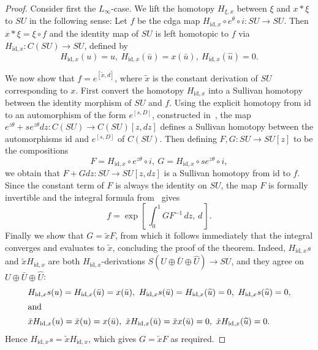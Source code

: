 \documentclass[a4paper,reqno]{amsart}
\theoremstyle{plain}
\theoremstyle{definition}
\theoremstyle{remark}
\newcommand{\id}{\mathrm{id}}
\begin{document}
\begin{proof}
  Consider first the $L_{\infty}$-case.
  We lift the homotopy $H_{\xi,x}$ between $\xi$ and $x * \xi$ to $SU$ in the following sense: 
  Let $f$ be the cdga map $H_{\id,x} \circ e^{\theta} \circ i \colon SU \to SU$. Then $x * \xi = \xi \circ f$ and the identity map of $SU$ is left homotopic to $f$ via $H_{\id, x} \colon C(SU) \to SU$, defined by 
  \[
    H_{\id,x}(u) = u,\  
    H_{\id,x}(\bar{u}) = x(\bar{u}),\ 
    H_{\id,x}(\widehat{u}) = 0.
  \]

  We now show that $f = e^{[\tilde{x},d]}$, where $\tilde{x}$ is the constant derivation of $SU$ corresponding to $x$. 
  First convert the homotopy $H_{\id,x}$ into a Sullivan homotopy between the identity morphism of $SU$ and $f$.  
  Using the explicit homotopy from $\id$ to an automorphism of the form $e^{[s,D]}$, constructed in~\cite[Theorem 3.4]{bl05}, the map 
  $e^{z\theta} + se^{z\theta} dz \colon C(SU) \to C(SU)[z,dz]$ 
  defines a Sullivan homotopy between the automorphisms $\id$ and $e^{[s,D]}$ of $C(SU)$. 
  Then defining $F, G \colon SU \to SU[z]$ to be the compositions
  \[
    F = H_{\id,x} \circ e^{z\theta} \circ i,\ G = H_{\id,x} \circ se^{z\theta} \circ i,
  \]
  we obtain that $F+Gdz \colon SU \to SU[z,dz]$ is a Sullivan homotopy from $\id$ to $f$.
  Since the constant term of $F$ is always the identity on $SU$, the map $F$ is formally invertible and the integral formula from~\cite{bl05} gives 
  \[
    f = \exp\left[\,\int_0^1 GF^{-1}\,dz, \,d \,\right].
  \]
  Finally we show that $G=\tilde{x}F$, from which it follows immediately that the integral converges and evaluates to $\tilde{x}$, concluding the proof of the theorem.
  Indeed, $H_{\id,x}s$ and $\tilde{x}H_{\id,x}$ are both $H_{\id,x}$-derivations $S(U \oplus \bar{U} \oplus \widehat{U}) \to SU$, and they agree on $U \oplus \bar{U} \oplus \widehat{U}$:
  \begin{align*}
    &H_{\id,x}s(u) = H_{\id,x}(\bar{u}) =  x(\bar{u}),\ 
    H_{\id,x}s(\bar{u}) = H_{\id,x}(\widehat{u}) = 0,\ 
    H_{\id,x}s(\widehat{u}) = 0,\\
    \shortintertext{and}
    &\tilde{x}H_{\id,x}(u) = \tilde{x}(u) = x(\bar{u}),\ 
    \tilde{x}H_{\id,x}(\bar{u}) = \tilde{x}x(\bar{u}) = 0,\ 
    \tilde{x}H_{\id,x}(\widehat{u}) = 0. 
  \end{align*}
  Hence $H_{\id,x}s=\tilde{x}H_{\id,x}$, which gives $G=\tilde{x}F$ as required.


\end{proof}
\end{document}
